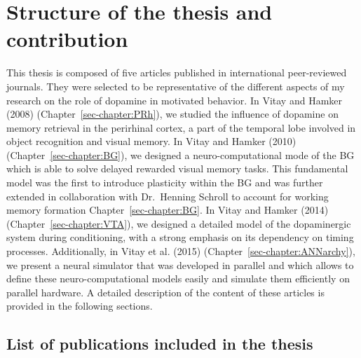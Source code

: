 \documentclass[
  11pt,
  a4paper,
]{scrbook}
\begin{document}
\section{Structure of the thesis and
contribution}\label{structure-of-the-thesis-and-contribution}

This thesis is composed of five articles published in international
peer-reviewed journals. They were selected to be representative of the
different aspects of my research on the role of dopamine in motivated
behavior. In Vitay and Hamker (2008) (Chapter~\ref{sec-chapter:PRh}), we
studied the influence of dopamine on memory retrieval in the perirhinal
cortex, a part of the temporal lobe involved in object recognition and
visual memory. In Vitay and Hamker (2010)
(Chapter~\ref{sec-chapter:BG}), we designed a neuro-computational mode
of the BG which is able to solve delayed rewarded visual memory tasks.
This fundamental model was the first to introduce plasticity within the
BG and was further extended in collaboration with Dr.~Henning Schroll to
account for working memory formation Chapter~\ref{sec-chapter:BG}. In
Vitay and Hamker (2014) (Chapter~\ref{sec-chapter:VTA}), we designed a
detailed model of the dopaminergic system during conditioning, with a
strong emphasis on its dependency on timing processes. Additionally, in
Vitay et al. (2015) (Chapter~\ref{sec-chapter:ANNarchy}), we present a
neural simulator that was developed in parallel and which allows to
define these neuro-computational models easily and simulate them
efficiently on parallel hardware. A detailed description of the content
of these articles is provided in the following sections.

\subsection*{List of publications included in the
thesis}\label{list-of-publications-included-in-the-thesis}
\end{document}
